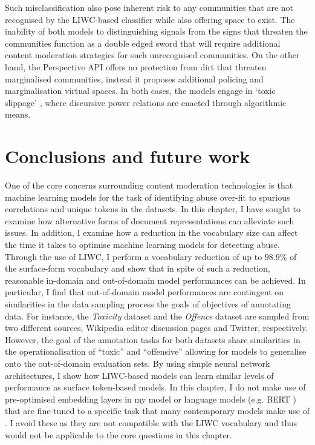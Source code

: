 Such misclassification also pose inherent risk to any communities that are not recognised by the LIWC-based classifier while also offering space  to exist.  
The inability of both models to distinguishing signals from the signs that threaten the communities function as a double edged sword that will require additional content moderation strategies for such unrecognised communities.  
On the other hand, the Perspective API offers no protection from dirt that threaten marginalised communities, instead it proposes additional policing and marginalisation virtual spaces.  
In both cases, the models engage in `toxic slippage' \citep{Risam:2015}, where discursive power relations are enacted through algorithmic means.  
  
\section{Conclusions and future work}  
One of the core concerns surrounding content moderation technologies is that machine learning models for the task of identifying abuse over-fit to spurious correlations and unique tokens in the datasets.  
In this chapter, I have sought to examine how alternative forms of document representations can alleviate such issues.  
In addition, I examine how a reduction in the vocabulary size can affect the time it takes to optimise machine learning models for detecting abuse.  
Through the use of LIWC, I perform a vocabulary reduction of up to $98.9\%$ of the surface-form vocabulary and show that in spite of such a reduction, reasonable in-domain and out-of-domain model performances can be achieved.  
In particular, I find that out-of-domain model performances are contingent on similarities in the data sampling process  the goals of objectives of annotating data.  
For instance, the \textit{Toxicity} dataset and the \textit{Offence} dataset are sampled from two different sources, Wikipedia editor discussion pages and Twitter, respectively.  
However, the goal of the annotation tasks for both datasets share similarities in the operationalisation of ``toxic'' and ``offensive'' allowing for models to generalise onto the out-of-domain evaluation sets.  
By using simple neural network architectures, I show how LIWC-based models can learn similar levels of performance as surface token-based models.  
In this chapter, I do not make use of pre-optimised embedding layers \citep{Park:2017,Kolhatkar:2020} in my model or language models (e.g. BERT \citep{Devlin:2019}) that are fine-tuned to a specific task that many contemporary models make use of \citet[e.g.]{Vidgen_learning:2020,Isaksen:2020}.  
I avoid these as they are not compatible with the LIWC vocabulary and thus would not be applicable to the core questions in this chapter.  
  
